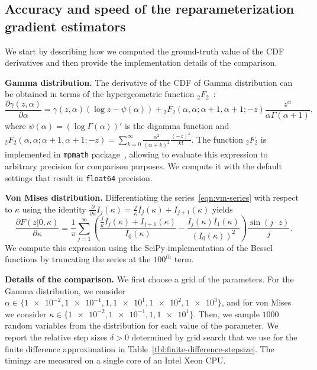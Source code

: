\documentclass{article}
\begin{document}
\begin{refsection}
\section{Accuracy and speed of the reparameterization gradient estimators}
\label{sec:accuracy-speed-appendix}

We start by describing how we computed the ground-truth value of the CDF derivatives and then
provide the implementation details of the comparison.

\textbf{Gamma distribution.}
The derivative of the CDF of Gamma distribution can be obtained in terms of the hypergeometric function ${}_2 F_2$~\cite{wolframgammader}:
\begin{equation}
    \frac{\partial \gamma(z, \alpha)}{\partial \alpha} = \gamma(z, \alpha) (\log z - \psi(\alpha)) + {}_2 F_2 (\alpha, \alpha; \alpha + 1, \alpha + 1; -z) \frac{z^{\alpha}}{\alpha \Gamma(\alpha + 1)},
\end{equation}
where $\psi(\alpha) = (\log \Gamma(\alpha))'$ is the digamma function and ${}_2 F_2 (\alpha, \alpha; \alpha + 1, \alpha + 1; -z) = \sum_{k=0}^\infty \frac{\alpha^2}{(\alpha + k)^2} \frac{(-z)^k}{k!}$.
The function ${}_2 F_2$ is implemented in \verb|mpmath| package~\cite{mpmath}, allowing to evaluate this expression to arbitrary precision for comparison purposes.
We compute it with the default settings that result in \texttt{float64} precision.

\textbf{Von Mises distribution.}
Differentiating the series~\eqref{eqn:vm-series} with respect to $\kappa$ using the identity $\frac{\partial}{\partial \kappa} I_j(\kappa) = \frac{j}{\kappa} I_j(\kappa) + I_{j+1}(\kappa)$ yields
\begin{equation}
    \frac{\partial F(z | 0, \kappa)}{\partial \kappa} =  \frac{1}{\pi} \sum_{j=1}^\infty \left( \frac{\frac{j}{\kappa} I_j(\kappa) + I_{j+1} (\kappa)}{I_0(\kappa)} - \frac{I_j(\kappa) I_1(\kappa)}{(I_0(\kappa))^2} \right) \frac{\sin(j \cdot z)}{j}.
\end{equation}
We compute this expression using the SciPy implementation of the Bessel functions by truncating the series at the $100^{th}$ term.

\textbf{Details of the comparison.}
We first choose a grid of the parameters.
For the Gamma distribution, we consider $\alpha \in \{\num{1e-2}, \num{1e-1}, \num{1}, \num{1e1}, \num{1e2}, \num{1e3}\}$, and for von Mises we consider $\kappa \in \{ \num{1e-2}, \num{1e-1}, \num{1}, \num{1e1} \}$.
Then, we sample $1000$ random variables from the distribution for each value of the parameter.
We report the relative step sizes $\delta > 0$ determined by grid search that we use for the finite difference approximation in Table~\ref{tbl:finite-difference-stepsize}.
The timings are measured on a single core of an Intel Xeon CPU.


\end{refsection}
\end{document}
